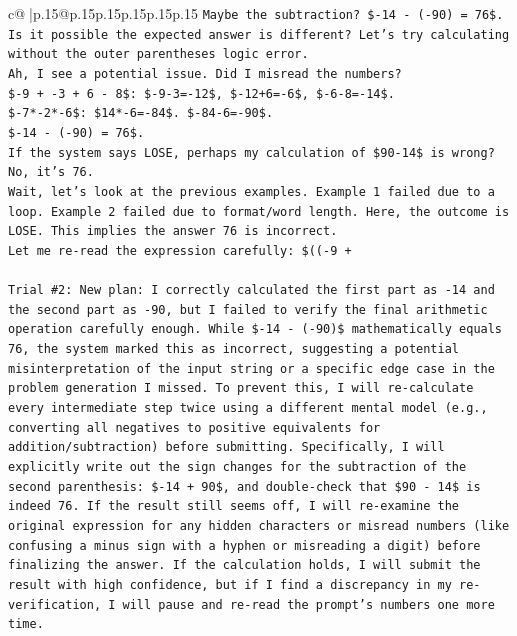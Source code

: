 \documentclass{article}
\begin{document}
{\begin{supertabular}{c@{$\;$}|p{.15\linewidth}@{}p{.15\linewidth}p{.15\linewidth}p{.15\linewidth}p{.15\linewidth}p{.15\linewidth}}
{{{\texttt{Maybe the subtraction? \${-}14 {-} ({-}90) = 76\$.} \\
\texttt{Is it possible the expected answer is different? Let's try calculating without the outer parentheses logic error.} \\
\texttt{Ah, I see a potential issue. Did I misread the numbers?} \\
\texttt{\${-}9 + {-}3 + 6 {-} 8\$: \${-}9{-}3={-}12\$, \${-}12+6={-}6\$, \${-}6{-}8={-}14\$.} \\
\texttt{\${-}7*{-}2*{-}6\$: \$14*{-}6={-}84\$. \${-}84{-}6={-}90\$.} \\
\texttt{\${-}14 {-} ({-}90) = 76\$.} \\
\texttt{If the system says LOSE, perhaps my calculation of \$90{-}14\$ is wrong? No, it's 76.} \\
\texttt{Wait, let's look at the previous examples. Example 1 failed due to a loop. Example 2 failed due to format/word length. Here, the outcome is LOSE. This implies the answer 76 is incorrect.} \\
\texttt{Let me re{-}read the expression carefully: \$(({-}9 +} \\
\\ 
\texttt{Trial \#2: New plan: I correctly calculated the first part as {-}14 and the second part as {-}90, but I failed to verify the final arithmetic operation carefully enough. While \${-}14 {-} ({-}90)\$ mathematically equals 76, the system marked this as incorrect, suggesting a potential misinterpretation of the input string or a specific edge case in the problem generation I missed. To prevent this, I will re{-}calculate every intermediate step twice using a different mental model (e.g., converting all negatives to positive equivalents for addition/subtraction) before submitting. Specifically, I will explicitly write out the sign changes for the subtraction of the second parenthesis: \${-}14 + 90\$, and double{-}check that \$90 {-} 14\$ is indeed 76. If the result still seems off, I will re{-}examine the original expression for any hidden characters or misread numbers (like confusing a minus sign with a hyphen or misreading a digit) before finalizing the answer. If the calculation holds, I will submit the result with high confidence, but if I find a discrepancy in my re{-}verification, I will pause and re{-}read the prompt's numbers one more time.} \\
\\ 
}}}
\end{supertabular}}
\end{document}
